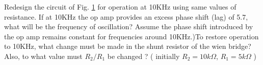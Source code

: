 Redesign the circuit of Fig. \ref{fig:ee18btech11049_fig1} for operation at 10KHz using same values of resistance. If at 10KHz the op amp provides an excess phase shift (lag) of 5.7\degree , what will be the frequency of oscillation? Assume the phase shift introduced by the op amp remains constant for frequencies around 10KHz.)To restore operation to 10KHz, what change must be made in the shunt resistor of the wien bridge? Also, to what value must $R_{2}/R_{1}$ be changed ? (  initially $R_2 = 10k\Omega$, $R_1 = 5k\Omega$ )
\begin{figure}[!ht]
	\begin{center}
		\resizebox{\columnwidth}{!}{}
	\end{center}
\caption{}
\label{fig:ee18btech11049_fig1}
\end{figure}
